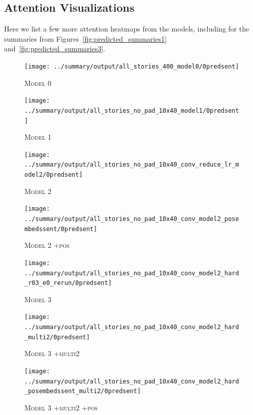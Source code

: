 \documentclass[12pt]{report}
\begin{document}
\begin{appendices}
\chapter{Attention Visualizations}
\label{appendix:attn}

Here we list a few more attention heatmaps from the models, including for the summaries from Figures~\ref{fig:predicted_summaries1} and~\ref{fig:predicted_summaries3}.

\begin{figure}[p]
\centering
\texttt{[image: ../summary/output/all\_stories\_400\_model0/0predsent]}
\caption[\textsc{Model 0} Attention]{\textsc{Model 0}}
\end{figure}

\begin{figure}[p]
\centering
\texttt{[image: ../summary/output/all\_stories\_no\_pad\_10x40\_model1/0predsent]}
\caption[\textsc{Model 1} Attention]{\textsc{Model 1}}
\end{figure}

\begin{figure}[p]
\centering
\texttt{[image: ../summary/output/all\_stories\_no\_pad\_10x40\_conv\_reduce\_lr\_model2/0predsent]}
\caption[\textsc{Model 2} Attention]{\textsc{Model 2}}
\end{figure}

\begin{figure}[p]
\centering
\texttt{[image: ../summary/output/all\_stories\_no\_pad\_10x40\_conv\_model2\_posembedssent/0predsent]}
\caption[\textsc{Model 2 +pos} Attention]{\textsc{Model 2 +pos}}
\end{figure}

\begin{figure}[p]
\centering
\texttt{[image: ../summary/output/all\_stories\_no\_pad\_10x40\_conv\_model2\_hard\_r03\_e0\_rerun/0predsent]}
\caption[\textsc{Model 3} Attention]{\textsc{Model 3}}
\end{figure}

\begin{figure}[p]
\centering
\texttt{[image: ../summary/output/all\_stories\_no\_pad\_10x40\_conv\_model2\_hard\_multi2/0predsent]}
\caption[\textsc{Model 3 +multi2} Attention]{\textsc{Model 3 +multi2}}
\end{figure}

\begin{figure}[p]
\centering
\texttt{[image: ../summary/output/all\_stories\_no\_pad\_10x40\_conv\_model2\_hard\_posembedssent\_multi2/0predsent]}
\caption[\textsc{Model 3 +multi2 +pos} Attention]{\textsc{Model 3 +multi2 +pos}}
\end{figure}


\end{appendices}
\end{document}
